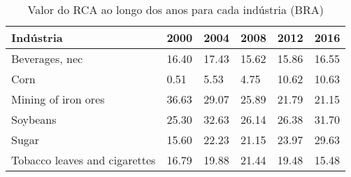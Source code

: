 \begin{table}
\centering
\caption{Valor do RCA ao longo dos anos para cada indústria (BRA)}
\begin{tabular}{p{6cm}p{1.5cm}p{1.5cm}p{1.5cm}p{1.5cm}p{1.5cm}}
\toprule
                    Indústria &  2000 &  2004 &  2008 &  2012 &  2016 \\
\midrule
               Beverages, nec & 16.40 & 17.43 & 15.62 & 15.86 & 16.55 \\
                         Corn &  0.51 &  5.53 &  4.75 & 10.62 & 10.63 \\
          Mining of iron ores & 36.63 & 29.07 & 25.89 & 21.79 & 21.15 \\
                     Soybeans & 25.30 & 32.63 & 26.14 & 26.38 & 31.70 \\
                        Sugar & 15.60 & 22.23 & 21.15 & 23.97 & 29.63 \\
Tobacco leaves and cigarettes & 16.79 & 19.88 & 21.44 & 19.48 & 15.48 \\
\bottomrule
\end{tabular}
\end{table}

